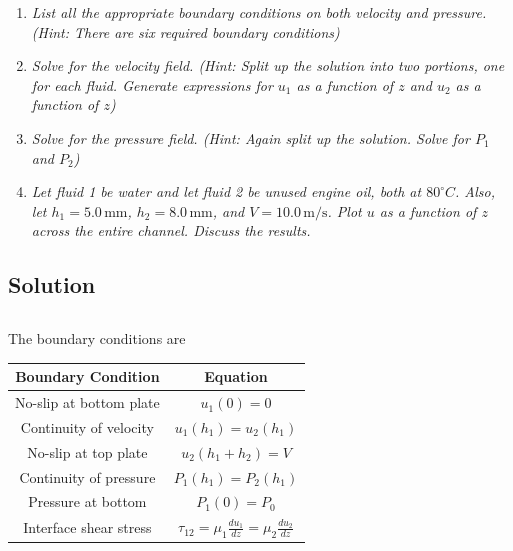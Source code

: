 \begin{enumerate}[label=\alph*)]
    \item \textit{List all the appropriate boundary conditions on both velocity and pressure. (Hint: There are six required boundary conditions)}
    \item \textit{Solve for the velocity field. (Hint: Split up the solution into two portions, one for each fluid. Generate expressions for $u_1$ as a function of $z$ and $u_2$ as a function of $z$)}
    \item \textit{Solve for the pressure field. (Hint: Again split up the solution. Solve for $P_1$ and $P_2$)}
    \item \textit{Let fluid 1 be water and let fluid 2 be unused engine oil, both at $80^\circ C$. Also, let $h_1 = 5.0 \, \text{mm}$, $h_2 = 8.0 \, \text{mm}$, and $V = 10.0 \, \text{m/s}$. Plot $u$ as a function of $z$ across the entire channel. Discuss the results.}
\end{enumerate}
\subsection*{Solution}
\subsection{}
The boundary conditions are 
\begin{table}[h]
    \centering
    \begin{tabular}{cc}
        \toprule
        Boundary Condition & Equation \\
        \hline
        No-slip at bottom plate & $u_1(0) = 0$ \\
        Continuity of velocity & $u_1(h_1) = u_2(h_1)$ \\
        No-slip at top plate & $u_2(h_1 + h_2) = V$ \\
        Continuity of pressure & $P_1(h_1) = P_2(h_1)$ \\
        Pressure at bottom & $P_1(0) = P_0$ \\
        Interface shear stress & $\tau_{12} = \mu_1 \frac{du_1}{dz} = \mu_2 \frac{du_2}{dz}$ \\
        \bottomrule
    \end{tabular}
\end{table}
\FloatBarrier
